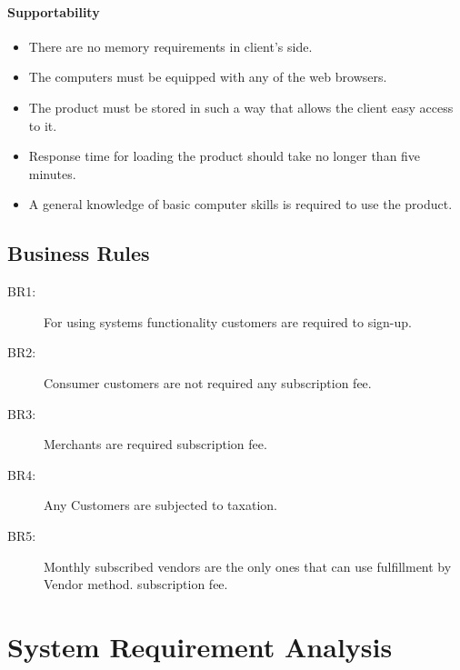 \paragraph{Supportability}
\begin{itemize}
	\item There are no memory requirements in client's side.
	\item The computers must be equipped with any of the web browsers.
	\item The product must be stored in such a way that allows the client easy access to it.
	\item Response time for loading the product should take no longer than five minutes.
	\item A general knowledge of basic computer skills is required to use the product.
\end{itemize}


\subsection{Business Rules}
\begin{description}
	\item[BR1:] For using systems functionality customers are required to sign-up.
	\item[BR2:] Consumer customers are not required any subscription fee.
	\item[BR3:] Merchants are required subscription fee.
	\item[BR4:] Any Customers are subjected to taxation.
	\item[BR5:] Monthly subscribed vendors are the only ones that can use fulfillment by Vendor method. 
	 subscription fee.
\end{description}


\section{System Requirement Analysis}
